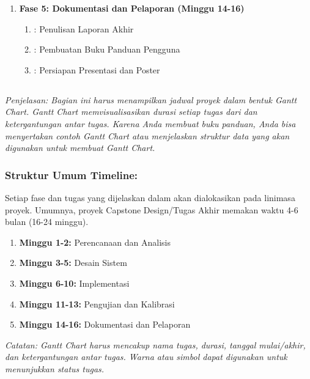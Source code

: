 \documentclass{elsinta}
\begin{document}
\begin{enumerate}
\begin{enumerate}
        \item {}: Pengujian Fungsionalitas Hardware
        \item {}: Kalibrasi Sensor dan Validasi Akurasi
        \item {}: Pengujian Integrasi Sistem End-to-End
        \item {}: Pengujian Performa dan Stabilitas Sistem
        \item {}: Pengujian Antarmuka Pengguna ()
    \end{enumerate}
    \item \textbf{Fase 5: Dokumentasi dan Pelaporan (Minggu 14-16)}
    \begin{enumerate}
        \item {}: Penulisan Laporan Akhir
        \item {}: Pembuatan Buku Panduan Pengguna
        \item {}: Persiapan Presentasi dan Poster
    \end{enumerate}
\end{enumerate}

\subsection{\TimelineTitle}
\textit{Penjelasan: Bagian ini harus menampilkan jadwal proyek dalam bentuk Gantt Chart. Gantt Chart memvisualisasikan durasi setiap tugas dari  dan ketergantungan antar tugas. Karena Anda membuat buku panduan, Anda bisa menyertakan contoh Gantt Chart atau menjelaskan struktur data yang akan digunakan untuk membuat Gantt Chart.}



\subsubsection*{Struktur Umum Timeline:}
Setiap fase dan tugas yang dijelaskan dalam  akan dialokasikan pada linimasa proyek. Umumnya, proyek Capstone Design/Tugas Akhir memakan waktu 4-6 bulan (16-24 minggu).
\begin{enumerate}
    \item \textbf{Minggu 1-2:} Perencanaan dan Analisis
    \item \textbf{Minggu 3-5:} Desain Sistem
    \item \textbf{Minggu 6-10:} Implementasi
    \item \textbf{Minggu 11-13:} Pengujian dan Kalibrasi
    \item \textbf{Minggu 14-16:} Dokumentasi dan Pelaporan
\end{enumerate}
\textit{Catatan: Gantt Chart harus mencakup nama tugas, durasi, tanggal mulai/akhir, dan ketergantungan antar tugas. Warna atau simbol dapat digunakan untuk menunjukkan status tugas.}
\end{document}
